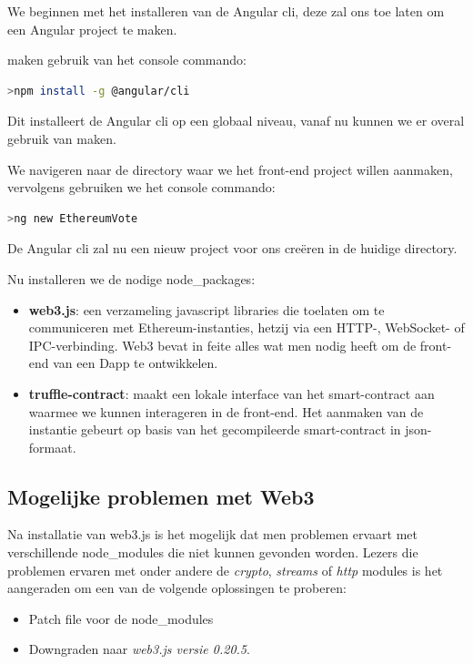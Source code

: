 	We beginnen met het installeren van de Angular cli, deze zal ons toe laten om een Angular project te maken.
	
	maken gebruik van het console commando:
	\begin{lstlisting}[numbers=none,language=bash]
	>npm install -g @angular/cli
	\end{lstlisting}
	Dit installeert de Angular cli op een globaal niveau, vanaf nu kunnen we er overal gebruik van maken.
	
	We navigeren naar de directory waar we het front-end project willen aanmaken, vervolgens gebruiken we het console commando:
	\begin{lstlisting}[numbers=none,language=bash]
	>ng new EthereumVote
	\end{lstlisting}
	De Angular cli zal nu een nieuw project voor ons creëren in de huidige directory. 
	
	Nu installeren we de nodige node\_packages:
	\begin{itemize}
		\item \textbf{web3.js}: een verzameling javascript libraries  die toelaten om te communiceren met Ethereum-instanties, hetzij via  een HTTP-, WebSocket- of IPC-verbinding. Web3 bevat in feite alles wat men nodig heeft om de front-end van een Dapp te ontwikkelen.
		\item \textbf{truffle-contract}: maakt een lokale interface van het smart-contract aan waarmee we kunnen interageren in de front-end. Het aanmaken van de instantie gebeurt op basis van het gecompileerde smart-contract in json-formaat.
	\end{itemize}

	\subsection{Mogelijke problemen met Web3}
	
	Na installatie van web3.js is het mogelijk dat men problemen ervaart met verschillende node\_modules die niet kunnen gevonden worden. Lezers die problemen ervaren met onder andere de \textit{crypto}, \textit{streams} of \textit{http } modules is het aangeraden om een van de volgende oplossingen te proberen:
	\begin{itemize}
		\item Patch file voor de node\_modules
		\item Downgraden naar \textit{web3.js versie 0.20.5}. 
	\end{itemize}
	
